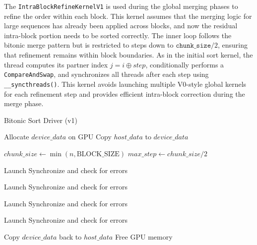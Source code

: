 \documentclass{article}
\begin{document}
The \texttt{IntraBlockRefineKernelV1} is used during the global merging phases to refine the order within each 
block. This kernel assumes that the merging logic for large sequences has already been applied across blocks, 
and now the residual intra-block portion needs to be sorted correctly. The inner loop follows the bitonic merge
pattern but is restricted to steps down to $\texttt{chunk\_size} / 2$, ensuring that refinement remains within 
block boundaries. As in the initial sort kernel, the thread computes its partner index $j = i \oplus step$, 
conditionally performs a \texttt{CompareAndSwap}, and synchronizes all threads after each step using 
\texttt{\_\_syncthreads()}. This kernel avoids launching multiple V0-style global kernels for each refinement 
step and provides efficient intra-block correction during the merge phase.

\begin{algorithm}[H]
\caption{Bitonic Sort Driver (v1)}
\begin{algorithmic}[1]
    \State Allocate $device\_data$ on GPU
    \State Copy $host\_data$ to $device\_data$
    
    \State $chunk\_size \gets \min(n, \text{BLOCK\_SIZE})$
    \State $max\_step \gets chunk\_size / 2$
    
    \State Launch  
    \State Synchronize and check for errors

            \State Launch  
            \State Synchronize and check for errors
        \EndFor

        \State Launch  
        \State Synchronize and check for errors
    \EndFor

        \State Launch 
        \State Synchronize and check for errors
    \EndIf

    \State Copy $device\_data$ back to $host\_data$
    \State Free GPU memory
\EndProcedure
\end{algorithmic}
\end{algorithm}
\end{document}
